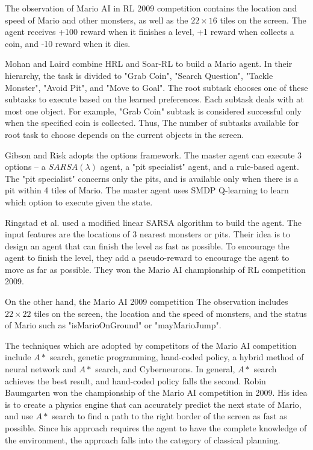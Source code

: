 The observation of Mario AI in RL 2009 competition 
contains the location and speed of Mario and other monsters, as well as
the $22 \times 16$ tiles on the screen.
The agent receives +100 reward when it finishes a level, +1 reward when collects
a coin, and -10 reward when it dies.


Mohan and Laird \cite{Mohan09} combine HRL and Soar-RL \cite{Nason05} to build
a Mario agent. In their hierarchy, the task is divided to "Grab Coin", "Search Question", "Tackle Monster",
"Avoid Pit", and "Move to Goal". 
The root subtask chooses one of these subtasks to execute based on the learned
preferences. Each subtask deals with at most one object. For example, 
"Grab Coin" subtask is considered successful only when the specified 
coin is collected. Thus, The number of subtasks available for root task to choose
depends on the current objects in the screen.

Gibson and Risk \cite{Gibson09} adopts the options framework.
The master agent can execute 3 options -- a $SARSA(\lambda)$ agent, a "pit specialist" agent, and a
rule-based agent. The "pit specialist" concerns only the pits, and is available only when
there is a pit within 4 tiles of Mario. 
The master agent uses SMDP Q-learning to learn which option to execute given the state.

Ringstad et al. \cite{Paul09} 
used a modified linear SARSA algorithm to build the agent.
The input features are the locations of 3 nearest monsters or pits.
Their idea is to design an agent that can finish the level as fast as possible.
To encourage the agent to finish the level, they add a pseudo-reward to encourage
the agent to move as far as possible.
They won the Mario AI championship of RL competition 2009.


On the other hand, the Mario AI 2009 competition \cite{Robin09} 
The observation includes $22 \times 22$ tiles on the screen, the location and the speed of monsters, 
and the status of Mario such as "isMarioOnGround" or "mayMarioJump".

The techniques which are adopted by competitors of the Mario AI competition include
$A*$ search, genetic programming, hand-coded policy, a hybrid method of neural network and $A*$ search,
and Cyberneurons.
In general, $A*$ search achieves the best result, and hand-coded policy falls the second.
Robin Baumgarten \cite{Robin09} won the championship of the Mario AI competition in 2009.
His idea is to create a physics engine that can accurately predict the next state of Mario, 
and use $A*$ search to find a path to the right border of the screen as fast as possible.
Since his approach requires the agent to have the complete knowledge of the environment,
the approach falls into the category of classical planning.


